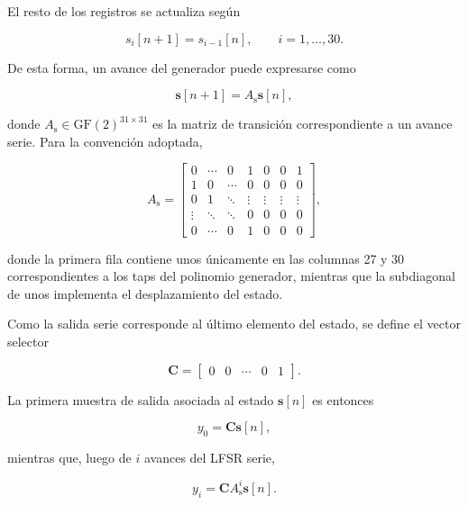 \documentclass[10pt,a4paper]{article}
\begin{document}
El resto de los registros se actualiza según

\begin{equation}
    s_i[n+1]=s_{i-1}[n],
    \qquad i=1,\ldots,30.
\end{equation}

De esta forma, un avance del generador puede expresarse como

\begin{equation}
    \mathbf{s}[n+1]
    =
    A_{\mathrm{s}}\mathbf{s}[n],
    \label{eq:prbs-transicion-serie}
\end{equation}

donde $A_{\mathrm{s}}\in\mathrm{GF}(2)^{31\times31}$ es la matriz de
transición correspondiente a un avance serie. Para la convención adoptada,

\begin{equation}
A_{\mathrm{s}}=
\begin{bmatrix}
0 & \cdots & 0 & 1 & 0 & 0 & 1 \\
1 & 0      & \cdots & 0 & 0 & 0 & 0 \\
0 & 1      & \ddots & \vdots & \vdots & \vdots & \vdots \\
\vdots & \ddots & \ddots & 0 & 0 & 0 & 0 \\
0 & \cdots & 0 & 1 & 0 & 0 & 0
\end{bmatrix},
\label{eq:prbs-matriz-serie}
\end{equation}

donde la primera fila contiene unos únicamente en las columnas 27 y 30
correspondientes a los taps del polinomio generador, mientras que la
subdiagonal de unos implementa el desplazamiento del estado.

Como la salida serie corresponde al último elemento del estado, se define el
vector selector

\begin{equation}
    \mathbf{C} =
    \begin{bmatrix}
        0 & 0 & \cdots & 0 & 1
    \end{bmatrix}.
\end{equation}

La primera muestra de salida asociada al estado $\mathbf{s}[n]$ es entonces

\begin{equation}
    y_0=\mathbf{C}\mathbf{s}[n],
\end{equation}

mientras que, luego de $i$ avances del LFSR serie,

\begin{equation}
    y_i
    =
    \mathbf{C}A_{\mathrm{s}}^i\mathbf{s}[n].
\end{equation}
\end{document}
